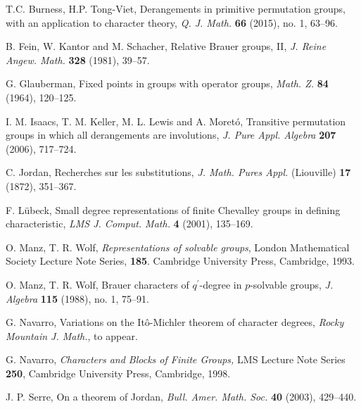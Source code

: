 \documentclass[12pt]{amsart}
\theoremstyle{remark}
\numberwithin{equation}{section}
\begin{document}
\begin{thebibliography}{100}

  T.C. Burness, H.P. Tong-Viet, Derangements in primitive permutation groups, with an application to character theory, \emph{Q. J. Math.} \textbf{66} (2015), no. 1, 63--96.

 B. Fein, W. Kantor and M. Schacher, Relative Brauer groups, II, \emph{J. Reine Angew. Math.} \textbf{328} (1981), 39--57.

 G. Glauberman, Fixed points in groups with operator groups, \emph{Math. Z.} \textbf{84} (1964), 120--125.

 I. M. Isaacs, T. M. Keller, M. L. Lewis and A. Moret\'{o}, Transitive permutation groups in which all derangements are involutions, \emph{J. Pure Appl. Algebra} \textbf{207} (2006), 717--724.

 C. Jordan, Recherches sur les substitutions, \emph{J. Math. Pures Appl.} (Liouville) \textbf{17} (1872), 351--367.

  F. L\"{u}beck, Small degree representations of finite Chevalley groups in defining characteristic, \emph{LMS J. Comput. Math.} \textbf{4} (2001), 135--169.

 O. Manz, T. R.  Wolf, \emph{Representations of solvable groups}, London Mathematical Society Lecture Note Series, \textbf{185}. Cambridge University Press, Cambridge, 1993.

  O. Manz, T. R. Wolf, Brauer characters of $q^\prime$-degree in $p$-solvable groups, \emph{J. Algebra} \textbf{115} (1988), no. 1, 75--91.

 G. Navarro, {Variations on the It\^{o}-Michler theorem of character degrees}, \emph{Rocky Mountain J. Math.}, to appear.

 G. Navarro, {\it Characters and Blocks of  Finite Groups,} LMS Lecture Note Series \textbf{250}, Cambridge University Press, Cambridge, 1998.

 J. P. Serre, On a theorem of Jordan, \emph{Bull. Amer. Math. Soc.} \textbf{40} (2003), 429--440.

\end{thebibliography}
\end{document}
